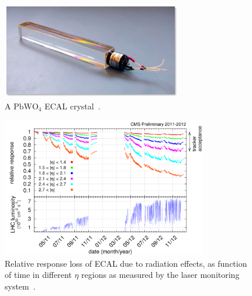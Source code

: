 \begin{figure}
\begin{center}
    \captionsetup{justification=centering}
  \includegraphics[width=0.7\textwidth,keepaspectratio]{plots_and_figures/chapter3/crystal.jpg}
\caption{A $\mathrm{PbWO}_4$ ECAL crystal~\cite{ecal1}.}
\label{fig:ecal_crystal}
\end{center}
\end{figure}

\begin{figure}
  \begin{center}
    \captionsetup{width=.8\textwidth,justification=centering}
  \includegraphics[width=0.8\textwidth,keepaspectratio]{plots_and_figures/chapter3/ecal_laser_corr.png}
\caption{Relative response loss of ECAL due to radiation effects, as function of time in different $\eta$ regions as measured by the laser monitoring system~\cite{ecal2}.}
\label{fig:ecal_las_corr}
\end{center}
\end{figure}

